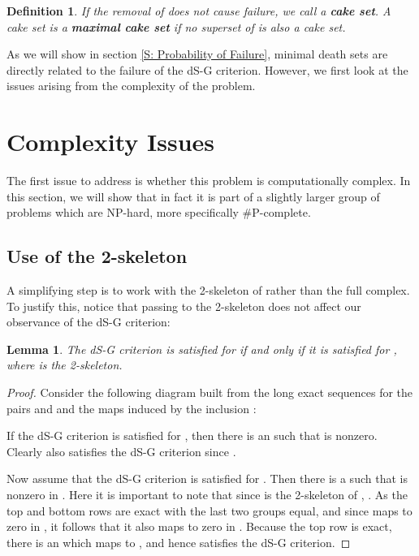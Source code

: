 \documentclass[10pt,twocolumn]{article} \usepackage{amsmath,epsf,amssymb,cite,pifont,amsthm, mathrsfs,epsfig,  bbm, amsthm,  setspace}
\newtheorem{lemma}{Lemma}
\newtheorem{defn}{Definition}
\renewcommand{\1}{\mathbbm{1}}
\begin{document}
\begin{defn}
If the removal of  does not cause failure, we call  a \textbf{cake set}.
A cake set  is a \textbf{maximal cake set} if no superset of  is also a cake set.
\end{defn}
As we will show in section \ref{S: Probability of Failure}, minimal death sets are directly related to the failure of the dS-G criterion.
However, we first look at the issues arising from the complexity of the problem.




\section{Complexity Issues}\label{S: Complexity}

The first issue to address is whether this problem is computationally complex.
In this section, we will show that  in fact it is part of a slightly larger group of problems which are  NP-hard, more specifically \#P-complete.

\subsection{Use of the 2-skeleton} \label{S: 2-skeleton}
A simplifying step is to work with the 2-skeleton  of  rather than the full complex.
To justify this, notice that passing to the 2-skeleton does not affect our observance of the dS-G criterion:

\begin{lemma}
The dS-G criterion is satisfied for  if and only if it is satisfied for ,
where  is the 2-skeleton.
\label{L: 2-skeleton}
\end{lemma}
\begin{proof}
Consider the following diagram built from the long exact sequences for the pairs 
and  and the maps induced by the inclusion :

If the dS-G criterion is satisfied for , then there is an 
such that  is nonzero.
Clearly  also satisfies the dS-G criterion since .

Now assume that the dS-G criterion is satisfied for .
Then there is a  such that  is nonzero in .
Here it is important to note that since  is the 2-skeleton of ,
.
As the top and bottom rows are exact with the last two groups equal,
and since  maps to zero in ,
it follows that it also maps to zero in .
Because the top row is exact, there is an  which maps to ,
and hence satisfies the dS-G criterion.
\end{proof}
\end{document}
